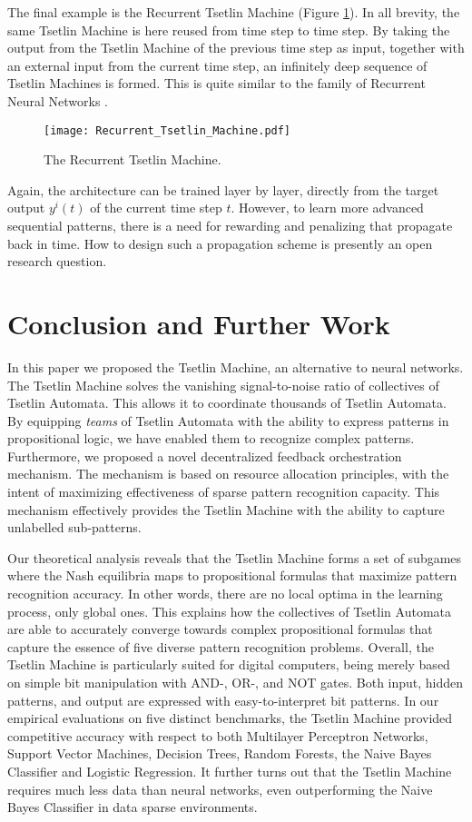 \documentclass[11pt,a4paper]{article}
\begin{document}
The final example is the Recurrent Tsetlin Machine \cite{Granmo2018c} (Figure \ref{figure:recurrent_tsetlin_machine}). In all brevity, the same Tsetlin Machine is here reused from time step to time step. By taking the output from the Tsetlin Machine of the previous time step as input, together with an external input from the current time step, an infinitely deep sequence of Tsetlin Machines is formed. This is quite similar to the family of Recurrent Neural Networks \cite{Schmidhuber2015}.
\begin{figure}[!th]
\centering
\texttt{[image: Recurrent\_Tsetlin\_Machine.pdf]}
\caption{The Recurrent Tsetlin Machine.}
\label{figure:recurrent_tsetlin_machine}
\end{figure}
Again, the architecture can be trained layer by layer, directly from the target output $y^i(t)$ of the current time step $t$. However, to learn more advanced sequential patterns, there is a need for rewarding and penalizing that propagate back in time. How to design such a propagation scheme is presently an open research question.

\section{Conclusion and Further Work}
\label{sec:conclusion}

In this paper we proposed the Tsetlin Machine, an alternative to neural networks. The Tsetlin Machine solves the vanishing signal-to-noise ratio of collectives of Tsetlin Automata. This allows it to coordinate thousands of Tsetlin Automata. By equipping \emph{teams} of Tsetlin Automata with the ability to express patterns in propositional logic, we have enabled them to recognize complex patterns. Furthermore, we proposed a novel decentralized feedback orchestration mechanism. The mechanism is based on resource allocation principles, with the intent of maximizing effectiveness of sparse pattern recognition capacity. This mechanism effectively provides the Tsetlin Machine with the ability to capture unlabelled sub-patterns.

Our theoretical analysis reveals that the Tsetlin Machine forms a set of subgames where the Nash equilibria maps to propositional formulas that maximize pattern recognition accuracy. In other words, there are no local optima in the learning process, only global ones. This explains how the collectives of Tsetlin Automata are able to accurately converge towards complex propositional formulas that capture the essence of five diverse pattern recognition problems.  Overall, the Tsetlin Machine is particularly suited for digital computers, being merely based on simple bit manipulation with AND-, OR-, and NOT gates. Both input, hidden patterns, and output are expressed with easy-to-interpret bit patterns. In our empirical evaluations on five distinct benchmarks, the Tsetlin Machine provided competitive accuracy with respect to both Multilayer Perceptron Networks, Support Vector Machines, Decision Trees, Random Forests, the Naive Bayes Classifier and Logistic Regression. It further turns out that the Tsetlin Machine requires much less data than neural networks, even outperforming the Naive Bayes Classifier in data sparse environments. 
\end{document}
